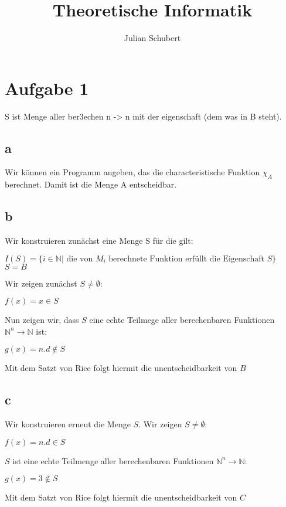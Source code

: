 \documentclass[14pt]{article}
\title{Theoretische Informatik}
\author{Julian Schubert}
\begin{document}
\maketitle

\section*{Aufgabe 1}
S ist Menge aller ber3echen n -> n mit der eigenschaft (dem was in B steht).
\subsection*{a}
Wir können ein Programm angeben, das die characteristische Funktion $\chi_A$ berechnet. Damit
ist die Menge A entscheidbar.
\subsection*{b}
Wir konstruieren zunächst eine Menge S für die gilt: \\
\begin{center}
    $I(S) = \{ i \in \mathbb{N} | \text{ die von $M_i$ berechnete Funktion erfüllt die
    Eigenschaft } S\}$ \\
    $S = B$
\end{center}
Wir zeigen zunächst $S \neq \emptyset$:
\begin{center}
    $f(x) = x \in S$
\end{center}
Nun zeigen wir, dass $S$ eine echte Teilmege aller berechenbaren Funktionen $\mathbb{N}^n
\rightarrow \mathbb{N}$ ist:
\begin{center}
    $g(x) = n.d \notin S$
\end{center}
Mit dem Satzt von Rice folgt hiermit die unentscheidbarkeit von $B$
\subsection*{c}
Wir konstruieren erneut die Menge $S$. Wir zeigen $S \neq \emptyset$:
\begin{center}
    $f(x) = n.d \in S$
\end{center}
$S$ ist eine echte Teilmenge aller berechenbaren Funktionen $\mathbb{N}^n
\rightarrow \mathbb{N}$:
\begin{center}
    $g(x) = 3 \notin S$
\end{center}
Mit dem Satzt von Rice folgt hiermit die unentscheidbarkeit von $C$
\end{document}
